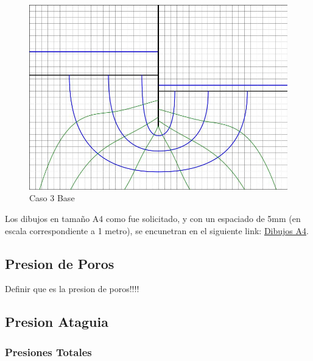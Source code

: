 \documentclass{article}
\begin{document}
\begin{figure}[H]
\begin{minipage}{0.32\textwidth}
      \includegraphics[width=\textwidth]{FOTOS/caso_3dibujo_base.jpg}
      \caption{Caso 3 Base}
  \end{minipage}
\end{figure}

Los dibujos en tamaño A4 como fue solicitado, y con un espaciado de 5mm (en escala correspondiente a 1 metro), se encunetran en
el siguiente link: \href{https://github.com/LukasWolff2002/PROYECTO_1_MCOCo}{Dibujos A4}.

\subsection{Presion de Poros}

Definir que es la presion de poros!!!!

\subsection{Presion Ataguia}

\subsubsection{Presiones Totales}
\end{document}
